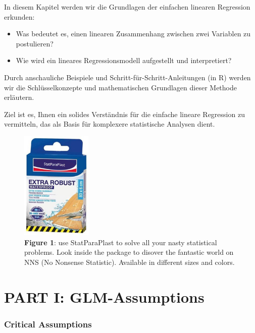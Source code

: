 \documentclass[
]{article}
\providecommand{\tightlist}{%
  \setlength{\itemsep}{0pt}\setlength{\parskip}{0pt}}
\begin{document}
In diesem Kapitel werden wir die Grundlagen der einfachen linearen Regression erkunden:

\begin{itemize}
\tightlist
\item
  Was bedeutet es, einen linearen Zusammenhang zwischen zwei Variablen zu postulieren?
\item
  Wie wird ein lineares Regressionsmodell aufgestellt und interpretiert?
\end{itemize}

Durch anschauliche Beispiele und Schritt-für-Schritt-Anleitungen (in R) werden wir die Schlüsselkonzepte und mathematischen Grundlagen dieser Methode erläutern.

Ziel ist es, Ihnen ein solides Verständnis für die einfache lineare Regression zu vermitteln, das als Basis für komplexere statistische Analysen dient.

\begin{figure}
\centering
\includegraphics[width=0.3\textwidth,height=\textheight]{Images/RobustHansaPlast.JPG}
\caption{\textbf{Figure 1}: use StatParaPlast to solve all your nasty statistical problems. Look inside the package to disover the fantastic world on NNS (No Nonsense Statistic). Available in different sizes and colors.}
\end{figure}

\part*{PART I: GLM-Assumptions}\label{part-part-i-glm-assumptions}

\section*{Critical Assumptions}\label{critical-assumptions}
\end{document}
